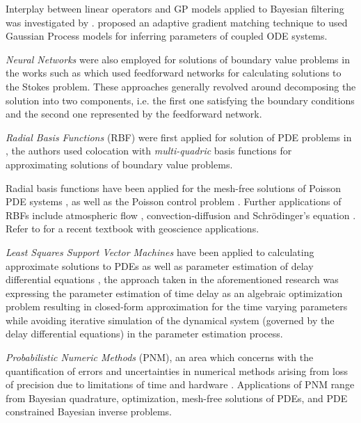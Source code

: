 Interplay between linear operators and GP models applied to Bayesian filtering was investigated by 
\citet{Sarkka2011}. \citet{pmlr-v31-dondelinger13a} proposed an adaptive gradient matching 
technique to used Gaussian Process models for inferring parameters of coupled ODE systems.

\emph{Neural Networks} were also employed for solutions of boundary value problems in the 
works such as \citet{Lagaris,Aarts2001,TSOULOS20092385,Baymani2011} which used feedforward networks 
for calculating solutions to the Stokes problem. These approaches generally revolved around 
decomposing the solution into two components, i.e. the first one satisfying the boundary conditions 
and the second one represented by the feedforward network.

\emph{Radial Basis Functions} (RBF) were first applied for solution of PDE problems in 
\citet{KANSA1990147}, the authors used colocation with \emph{multi-quadric} basis functions for 
approximating solutions of boundary value problems.

Radial basis functions have been applied for the mesh-free solutions of Poisson PDE systems 
\citep{AMINATAEI20082887,DUAN200866,DUAN2006394,CNM:CNM419}, as well as the Poisson control problem 
\citep{Pearson2013}. Further applications of RBFs include atmospheric flow 
\citep{Tillenius2015406}, convection-diffusion \citep{Safdari-Vaighani2015} and Schr\"{o}dinger's 
equation \citep{doi:10.1137/120893975}. Refer to \citet{fornberg2015} for a recent textbook with 
geoscience applications.

\emph{Least Squares Support Vector Machines} have been applied to calculating 
approximate solutions to PDEs \citep{MEHRKANOON2015105,MEHRKANOON20122502} as well as parameter 
estimation of delay differential equations \citep{MEHRKANOON2014830}, the approach taken in the 
aforementioned research \citep{MEHRKANOON2014830} was expressing the parameter estimation of time 
delay as an algebraic optimization problem resulting in closed-form approximation for the time 
varying parameters while avoiding iterative simulation of the dynamical system (governed by the 
delay differential equations) in the parameter estimation process.

\emph{Probabilistic Numeric Methods} (PNM), an area which concerns with the quantification of 
errors and uncertainties in numerical methods arising from loss of precision due to limitations of 
time and hardware \citep{hennig2015probabilistic}. Applications of PNM range from Bayesian 
quadrature, optimization, mesh-free solutions of PDEs, and PDE constrained Bayesian inverse 
problems. 

